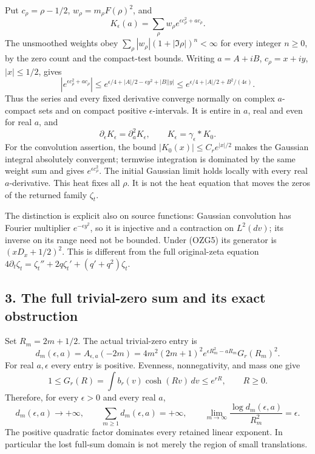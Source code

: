 \documentclass[
  10pt,
  a4paper,
]{article}
\begin{document}
Put \(c_\rho=\rho-1/2\), \(w_\rho=m_\rho F(\rho)^2\), and \[
K_\epsilon(a)=\sum_\rho w_\rho e^{\epsilon c_\rho^2+ac_\rho}.
\tag{OZG8}
\] The unsmoothed weights obey
\(\sum_\rho|w_\rho|(1+|\Im\rho|)^n<\infty\) for every integer \(n\ge0\),
by the zero count and the compact-test bounds. Writing \(a=A+iB\),
\(c_\rho=x+iy\), \(|x|\le1/2\), gives \[
\left|e^{\epsilon c_\rho^2+ac_\rho}\right|
\le e^{\epsilon/4+|A|/2-\epsilon y^2+|B||y|}
\le e^{\epsilon/4+|A|/2+B^2/(4\epsilon)}.
\tag{OZG9}
\] Thus the series and every fixed derivative converge normally on
complex \(a\)-compact sets and on compact positive
\(\epsilon\)-intervals. It is entire in \(a\), real and even for real
\(a\), and \[
\partial_\epsilon K_\epsilon=\partial_a^2K_\epsilon,\qquad
K_\epsilon=\gamma_\epsilon*K_0.
\tag{OZG10}
\] For the convolution assertion, the bound \(|K_0(x)|\le C_re^{|x|/2}\)
makes the Gaussian integral absolutely convergent; termwise integration
is dominated by the same weight sum and gives \(e^{\epsilon c_\rho^2}\).
The initial Gaussian limit holds locally with every real
\(a\)-derivative. This heat fixes all \(\rho\). It is not the heat
equation that moves the zeros of the returned family \(\zeta_t\).

The distinction is explicit also on source functions: Gaussian
convolution has Fourier multiplier \(e^{-\epsilon y^2}\), so it is
injective and a contraction on \(L^2(dv)\); its inverse on its range
need not be bounded. Under (OZG5) its generator is \((xD_x+1/2)^2\).
This is different from the full original-zeta equation
\(4\partial_t\zeta_t=\zeta_t''+2q\zeta_t'+(q'+q^2)\zeta_t\).

\subsection{3. The full trivial-zero sum and its exact
obstruction}\label{the-full-trivial-zero-sum-and-its-exact-obstruction}

Set \(R_m=2m+1/2\). The actual trivial-zero entry is \[
d_m(\epsilon,a)=A_{\epsilon,a}(-2m)
=4m^2(2m+1)^2
e^{\epsilon R_m^2-aR_m}G_r(R_m)^2.
\tag{OZG11}
\] For real \(a,\epsilon\) every entry is positive. Evenness,
nonnegativity, and mass one give \[
1\le G_r(R)=\int b_r(v)\cosh(Rv)\,dv\le e^{rR},\qquad R\ge0.
\tag{OZG12}
\] Therefore, for every \(\epsilon>0\) and every real \(a\), \[
d_m(\epsilon,a)\longrightarrow+\infty,\qquad
\sum_{m\ge1}d_m(\epsilon,a)=+\infty,\qquad
\lim_{m\to\infty}\frac{\log d_m(\epsilon,a)}{R_m^2}=\epsilon.
\tag{OZG13}
\] The positive quadratic factor dominates every retained linear
exponent. In particular the lost full-sum domain is not merely the
region of small translations.
\end{document}
